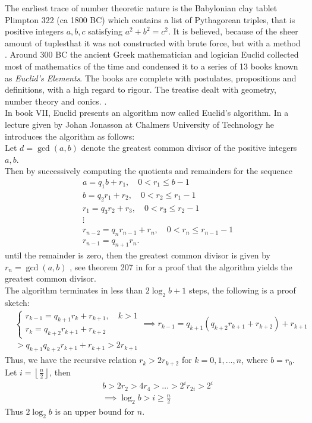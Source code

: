 The earliest trace of number theoretic nature is the Babylonian clay tablet Plimpton 322 (ca 1800 BC) which contains a list of Pythagorean triples, that is positive integers $a,b,c$ satisfying $a^2+b^2=c^2$. It is believed, because of the sheer amount of tuples\textemdash that it was not constructed with brute force, but with a method \cite{plimpton322:collection}.
Around 300 BC the ancient Greek mathematician and logician Euclid collected most of mathematics of the time and condensed it to a series of 13 books known as \textit{Euclid's Elements}. The books are complete with postulates, propositions and definitions, with a high regard to rigour. The treatise dealt with geometry, number theory and conics. \cite{euclid:notgood}. \\
In book VII, Euclid presents an algorithm now called Euclid's algorithm. In a lecture given by Johan Jonasson at Chalmers University of Technology he introduces the algorithm as follows:\\
Let $d=\gcd{(a,b)}$ denote the greatest common divisor of the positive integers $a,b$.\\
Then by successively computing the quotients and remainders for the sequence
\begin{align*}
	&a=q_1b+r_1,\quad 0<r_1\leq b-1\\
	&b=q_2r_1+r_2,\quad 0<r_2\leq r_1-1\\
	&r_1=q_3r_2+r_3,\quad 0<r_3\leq r_2-1\\
	&\vdots\\
	&r_{n-2}=q_nr_{n-1}+r_n,\quad 0<r_n\leq r_{n-1}-1\\
	&r_{n-1}=q_{n+1}r_n.
\end{align*}
until the remainder is zero, then the greatest common divisor is given by $r_n=\gcd{(a,b)}$ \cite{talteori1}, see theorem 207 in \cite{hardy} for a proof that the algorithm yields the greatest common divisor.\\
\iftrue
\noindent
The algorithm terminates in less than $2\log_2{b}+1$ steps, the following is a proof sketch:
\begin{align*}
&\begin{cases}
	r_{k-1}=q_{k+1}r_{k}+r_{k+1},\quad k>1\\
	r_k=q_{k+2}r_{k+1}+r_{k+2}
\end{cases}
\implies r_{k-1}=q_{k+1}(q_{k+2}r_{k+1}+r_{k+2})+r_{k+1}\\
&>q_{k+1}q_{k+2}r_{k+1}+r_{k+1}>2r_{k+1}
\end{align*}
Thus, we have the recursive relation $r_k>2r_{k+2}$ for $k=0,1,\ldots,n$, where $b=r_0$. Let $i=\left\lfloor\frac{n}{2}\right\rfloor$, then
\begin{align*}
	&b>2r_2>4r_4>\ldots>2^ir_{2i}>2^i\\
	&\implies \log_2{b}>i\geq \frac{n}{2}
\end{align*}
Thus $2\log_2b$ is an upper bound for $n$.\\
\fi

